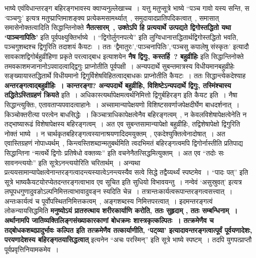 भाष्ये एवंविधान्तरङ्ग बहिरङ्गभावस्य क्वाप्यनुल्लेखाच्च~।
यत्तु मतुप्सूत्रे भाष्ये ``पञ्च गावो यस्य सन्ति, स `पञ्चगुः' इत्यत्र मतुप्प्राप्तिमाशङ्क्य प्रत्येकमसामर्थ्यात्~, समुदायादप्रातिपदिकत्वात्~, समासात्  समासेनोक्तत्वादिति सिद्धान्तिनोक्ते {\bfseries नैतत्सारम्~, उक्तेऽपि हि प्रत्ययार्थे उत्पद्यते द्विगोस्तद्धितो यथा `पाञ्चनापितिः'} इति पूर्वपक्ष्युक्तिर्भाष्ये~।
 ``द्विगोर्लुगनपत्ये'' इति लुग्विधानात्तद्धितार्थद्विगोस्तद्धितो भवति, पञ्चगुशब्दश्च द्विगुरिति तदाशयं कैयटः~।
ततः `द्वैमातुरः',`पाञ्चनापितिः',`पञ्चसु कपालेषु संस्कृतः' इत्यादौ सावकाशद्विगोर्बहुव्रीहिणा प्रकृते परत्वाद्बाध इत्याशयेन {\bfseries नैष द्विगुः, कस्तर्हि~? बहुव्रीहिः} इति सिद्धान्तिनोक्ते तमवकाशमजानानोऽपवादत्वाद्द्विगुः प्राप्नोतीति पूर्वपक्षी~।
अन्यपदार्थे सुबन्तमात्रस्य विधीयमानबहुव्रीहेः सङ्ख्यायास्तद्धितार्थे विधीयमानो द्विगुर्विशेषविहितत्वाद्बाधकः प्राप्नोतीति कैयटः~।
ततः सिद्धान्त्येकदेश्याह {\bfseries अन्तरङ्गत्वाद्बहुव्रीहिः~।
कान्तरङ्गा? अन्यपदार्थे बहुव्रीहिः, विशिष्टेऽन्यपदार्थे द्विगुः, तस्मिंश्चास्य तद्धितेऽस्तिग्रहणं क्रियते} इति~।
अधिकास्त्यर्थापेक्षमत्वर्थनिमित्तो द्विगुर्बहिरङ्ग इति कैयट इति~।
नैषा सिद्धान्त्युक्तिः, एतावताप्यपवादत्वाहानेः~।
अच्सामान्यापेक्षयणो विशिष्टसवर्णाजपेक्षदीर्घेण बाधदर्शनात्~।
किञ्चोक्तरीत्या परत्वेन बाधसिद्धेः~।
किञ्चात्राधिकापेक्षत्वेनैव बहिरङ्गत्वम्~, न केवलविशेषापेक्षत्वेनेति न तद्भाष्यारूढं विशेषापेक्षस्य बहिरङ्गत्वम्~।
अत एव सुबन्तसामान्यापेक्षो बहुव्रीहिः, तद्विशेषापेक्षो द्विगुरिति नोक्तं भाष्ये~।
न चार्थकृतबहिरङ्गत्वस्यानाश्रयणादिदमयुक्तम्~, एकदेश्युक्तित्वेनादोषात्~।
अत एवास्तिग्रहणं नोपाध्यर्थम्~, किन्त्वस्तिशब्दान्मतुबर्थमिति त्वदभिमतं बहिरङ्गत्वमपि द्विगोर्नास्तीति प्रतिपाद्य सिद्धान्तिना ``मत्वर्थे द्विगोः प्रतिषेधो वक्तव्यः'' इति वचनेनैतत्सिद्धमित्युक्तम्~।
अत एव ``तदोः सः सावनन्त्ययोः'' इति सूत्रेऽनन्त्ययोरिति चरितार्थम्~।
अन्यथा प्रत्ययसामान्यापेक्षत्वेनान्तरङ्गत्वादन्त्यस्यात्वेऽनन्त्यस्यैव सत्वे सिद्धे तद्वैय्यर्थ्यं स्पष्टमेव~।
 ``पादः पत्'' इति सूत्रे भाष्यकैयटयोरप्येतदन्तरङ्गत्वाभाव एव सूचित इति सुधियो विभावयन्तु~।
नन्वेवं `असुस्रुवत्' इत्यत्र लघूपधगुणादुवङोऽल्पनिमित्तत्वाभावादुवङ्न स्यदिति चेन्न~।
तत्रान्तःकार्यत्वरूपान्तरङ्गत्वसत्त्वात्~।
अन्तःकार्यत्वं च पूर्वोपस्थितनिमित्तकत्वम्~, अङ्गशब्दस्य निमित्तपरत्वात्~।
इदमन्तरङ्गत्वं लोकन्यायसिद्धमिति {\bfseries मनुष्योऽयं प्रातरुत्थाय शरीरकार्याणि करोति, ततः सुहृदाम् , ततः सम्बन्धिनाम्~।
अर्थानामपि जातिव्यक्तिलिङ्गसंख्याकारकाणां बोधक्रमः शास्त्रकृत्कल्पितः~।
तत्क्रमेणैव च तद्बोधकशब्दप्रादुर्भावः कल्पित इति तत्क्रमेणैव तत्कार्याणीति, `पट्व्या' इत्यादावन्तरङ्गत्वात्पूर्वं पूर्वयणादेशः, परयणादेशस्य बहिरङ्गतयासिद्धत्वात्} इत्यनेन ``अचः परस्मिन्'' इति सूत्रे भाष्ये स्पष्टम्~।
तदपि युगपत्प्राप्तौ पूर्वप्रवृत्तिनियामकमेव~।
